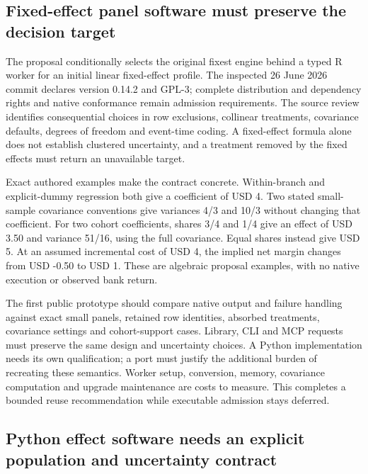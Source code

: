 \hypertarget{fixed-effect-panel-software-must-preserve-the-decision-target}{%
\subsection{Fixed-effect panel software must preserve the decision
target}\label{fixed-effect-panel-software-must-preserve-the-decision-target}}

The proposal conditionally selects the original fixest engine behind a
typed R worker for an initial linear fixed-effect profile. The inspected
26 June 2026 commit declares version 0.14.2 and GPL-3; complete
distribution and dependency rights and native conformance remain
admission requirements. The source review identifies consequential
choices in row exclusions, collinear treatments, covariance defaults,
degrees of freedom and event-time coding. A fixed-effect formula alone
does not establish clustered uncertainty, and a treatment removed by the
fixed effects must return an unavailable target.
\citep{exec20_fixest_source}

Exact authored examples make the contract concrete. Within-branch and
explicit-dummy regression both give a coefficient of USD 4. Two stated
small-sample covariance conventions give variances 4/3 and 10/3 without
changing that coefficient. For two cohort coefficients, shares 3/4 and
1/4 give an effect of USD 3.50 and variance 51/16, using the full
covariance. Equal shares instead give USD 5. At an assumed incremental
cost of USD 4, the implied net margin changes from USD -0.50 to USD 1.
These are algebraic proposal examples, with no native execution or
observed bank return. \citep{exec20_fixest_reference}

The first public prototype should compare native output and failure
handling against exact small panels, retained row identities, absorbed
treatments, covariance settings and cohort-support cases. Library, CLI
and MCP requests must preserve the same design and uncertainty choices.
A Python implementation needs its own qualification; a port must justify
the additional burden of recreating these semantics. Worker setup,
conversion, memory, covariance computation and upgrade maintenance are
costs to measure. This completes a bounded reuse recommendation while
executable admission stays deferred.

\hypertarget{python-effect-software-needs-an-explicit-population-and-uncertainty-contract}{%
\subsection{Python effect software needs an explicit population and
uncertainty
contract}\label{python-effect-software-needs-an-explicit-population-and-uncertainty-contract}}


